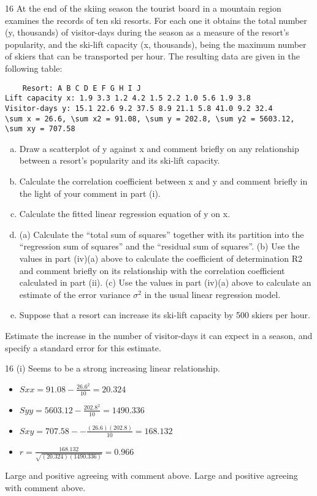 \documentclass[a4paper,12pt]{article}
\begin{document}
\begin{enumerate}%
16 At the end of the skiing season the tourist board in a mountain region examines
the records of ten ski resorts. For each one it obtains the total number (y,
thousands) of visitor-days during the season as a measure of the resort’s
popularity, and the ski-lift capacity (x, thousands), being the maximum number
of skiers that can be transported per hour. The resulting data are given in the
following table:
\begin{verbatim}
    Resort: A B C D E F G H I J
Lift capacity x: 1.9 3.3 1.2 4.2 1.5 2.2 1.0 5.6 1.9 3.8
Visitor-days y: 15.1 22.6 9.2 37.5 8.9 21.1 5.8 41.0 9.2 32.4
\sum x = 26.6, \sum x2 = 91.08, \sum y = 202.8, \sum y2 = 5603.12, \sum xy = 707.58
\end{verbatim}

\begin{enumerate}[(a)]
\item Draw a scatterplot of y against x and comment briefly on any relationship
between a resort’s popularity and its ski-lift capacity. 
\item Calculate the correlation coefficient between x and y and comment briefly
in the light of your comment in part (i). 
\item Calculate the fitted linear regression equation of y on x. 
\item (a) Calculate the “total sum of squares” together with its partition into
the “regression sum of squares” and the “residual sum of squares”.
(b) Use the values in part (iv)(a) above to calculate the coefficient of
determination R2 and comment briefly on its relationship with the
correlation coefficient calculated in part (ii).
(c) Use the values in part (iv)(a) above to calculate an estimate of the
error variance $\sigma^2$ in the usual linear regression model. 
\item Suppose that a resort can increase its ski-lift capacity by 500 skiers per
hour.
\end{enumerate}
Estimate the increase in the number of visitor-days it can expect in a
season, and specify a standard error for this estimate.


16 (i)
Seems to be a strong increasing linear relationship.
\begin{itemize}
\item
${ \displaystyle Sxx = 91.08 − \frac{26.6^2}{10} = 20.324  }$
\item ${ \displaystyle Syy = 5603.12 − \frac{202.8^2}{10} = 1490.336  }$
\item ${ \displaystyle Sxy = 707.58 −  − \frac{(26.6)(202.8)}{10} = 168.132  }$
\item ${ \displaystyle r = \frac{168.132}{\sqrt{(20.324)(1490.336)}}= 0.966}$
\end{itemize}
Large and positive agreeing with comment above.
Large and positive agreeing with comment above.


\end{enumerate}
\end{document}
